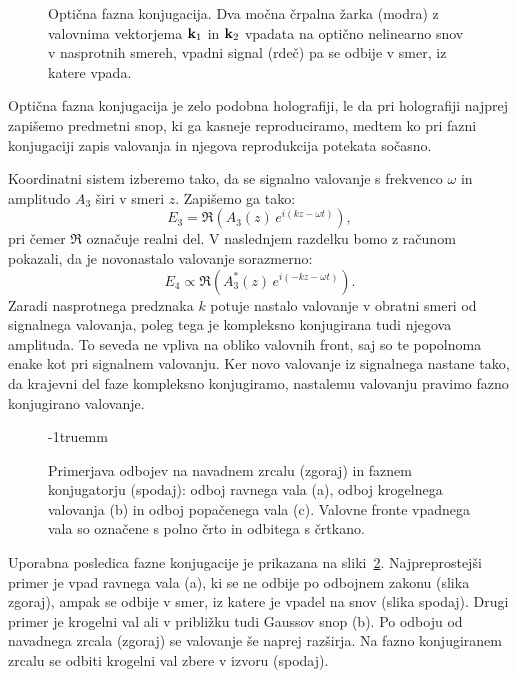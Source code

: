 \begin{figure}[ht]
\centering
\def\svgwidth{60truemm} 

\caption{Optična fazna konjugacija. Dva močna črpalna žarka (modra) z valovnima
vektorjema ${\bf k}_{1}$ in ${\bf k}_2$ vpadata na optično nelinearno snov v 
nasprotnih smereh, vpadni signal (rdeč) pa se odbije v 
smer, iz katere vpada.}
\label{08_OPC1}
\end{figure}

\begin{remark}Optična fazna konjugacija je zelo podobna holografiji, 
le da pri holografiji najprej zapišemo predmetni snop, ki ga kasneje reproduciramo, 
medtem ko pri fazni konjugaciji zapis valovanja in njegova reprodukcija 
potekata sočasno. 
\end{remark}

Koordinatni sistem izberemo tako, da se signalno valovanje s frekvenco $\omega$ in amplitudo $A_3$
širi v smeri $z$. Zapišemo ga tako:
\begin{equation}
E_{3}=\mathfrak{\Re}\left(A_3\left(z\right)\, e^{i\left(kz-\omega t\right)}\right)\!\!,
\label{8.97}
\end{equation}
pri čemer $\mathfrak{\Re}$ označuje realni del. 
V naslednjem razdelku bomo z računom pokazali, da je novonastalo valovanje sorazmerno:
\begin{equation}
E_{4} \propto \mathfrak{\Re}\left(A_3^{*}\left(z\right)\, e^{i\left(-kz-\omega t\right)}\right)\!\!.
\label{8.98}
\end{equation}
Zaradi nasprotnega predznaka $k$ potuje nastalo valovanje v obratni smeri od signalnega
valovanja, poleg tega je kompleksno konjugirana tudi njegova amplituda. To seveda
ne vpliva na obliko valovnih front, saj so te popolnoma enake kot pri signalnem
valovanju. Ker novo valovanje iz signalnega nastane tako,
da krajevni del faze kompleksno konjugiramo, nastalemu valovanju pravimo fazno
konjugirano valovanje.

\begin{figure}[ht]
\centering
\def\svgwidth{100truemm} 

\caption{Primerjava odbojev na navadnem zrcalu (zgoraj) in faznem konjugatorju (spodaj): odboj ravnega
vala (a), odboj krogelnega valovanja (b) in odboj popačenega vala (c). Valovne fronte 
vpadnega vala so označene s polno črto in odbitega s črtkano.}
\label{08_OPC2}
\vglue-1truemm
\end{figure}
Uporabna posledica fazne konjugacije je prikazana na sliki~\ref{08_OPC2}.
Najpreprostejši primer je vpad ravnega vala (a), ki se ne odbije po 
odbojnem zakonu (slika zgoraj), ampak se odbije v smer, iz katere 
je vpadel na snov (slika spodaj). Drugi primer je krogelni val 
ali v približku tudi Gaussov snop (b). Po odboju od navadnega zrcala (zgoraj) se 
valovanje še naprej razširja. Na fazno konjugiranem zrcalu se odbiti krogelni val 
zbere v izvoru (spodaj). 

